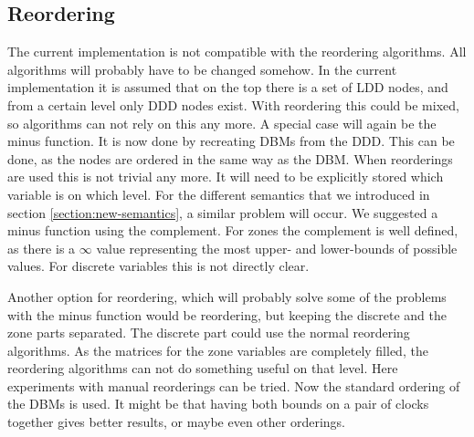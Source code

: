 \subsection{Reordering}
The current implementation is not compatible with the reordering algorithms. All algorithms will probably have to be changed somehow. In the current implementation it is assumed that on the top there is a set of LDD nodes, and from a certain level only DDD nodes exist. With reordering this could be mixed, so algorithms can not rely on this any more. A special case will again be the minus function. It is now done by recreating DBMs from the DDD. This can be done, as the nodes are ordered in the same way as the DBM. When reorderings are used this is not trivial any more. It will need to be explicitly stored which variable is on which level. For the different semantics that we introduced in section \ref{section:new-semantics}, a similar problem will occur. We suggested a minus function using the complement. For zones the complement is well defined, as there is a $\infty$ value representing the most upper- and lower-bounds of possible values. For discrete variables this is not directly clear.
 
Another option for reordering, which will probably solve some of the problems with the minus function would be reordering, but keeping the discrete and the zone parts separated. The discrete part could use the normal reordering algorithms. As the matrices for the zone variables are completely filled, the reordering algorithms can not do something useful on that level. Here experiments with manual reorderings can be tried. Now the standard ordering of the DBMs is used. It might be that having both bounds on a pair of clocks together gives better results, or maybe even other orderings.

